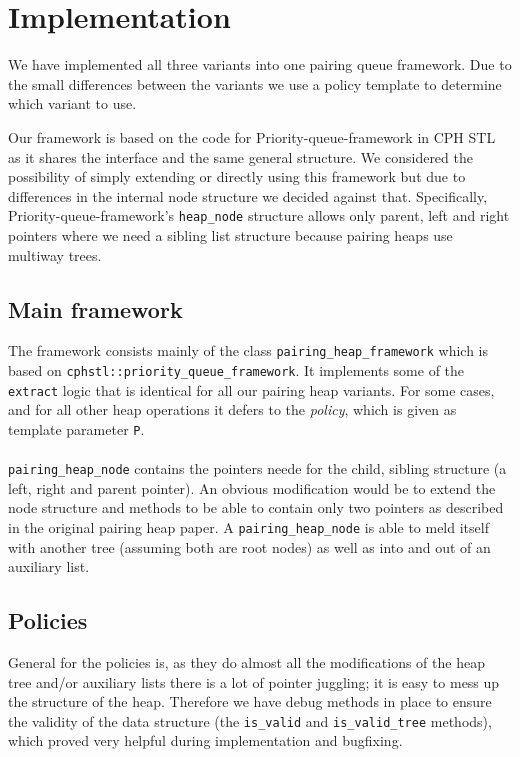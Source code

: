 \documentclass{DIKU-article}[2010/01/13]
\begin{document}
\section{Implementation}

We have implemented all three variants into one pairing queue framework. Due to
the small differences between the variants we use a policy template to determine
which variant to use. 

Our framework is based on the code for Priority-queue-framework in CPH STL as it
shares the interface and the same general structure. We considered the
possibility of simply extending or directly using this framework but due to
differences in the internal node structure we decided against that.
Specifically, Priority-queue-framework's \verb!heap_node! structure allows only
parent, left and right pointers where we need a sibling list structure because
pairing heaps use multiway trees.

\subsection{Main framework}

The framework consists mainly of the class \verb!pairing_heap_framework! which
is based on \verb!cphstl::priority_queue_framework!. It implements
some of the \verb!extract! logic that is identical for all our pairing heap
variants. For some cases, and for all other heap operations it defers to the
\emph{policy}, which is given as template parameter \verb!P!.\\
\\
\verb!pairing_heap_node! contains the pointers neede for the child, sibling
structure (a left, right and parent pointer). An obvious modification would be
to extend the node structure and methods to be able to contain only two pointers
as described in the original pairing heap paper\cite{fredman}. A
\verb!pairing_heap_node! is able to meld itself with another tree (assuming both
are root nodes) as well as into and out of an auxiliary list.

\subsection{Policies}

General for the policies is, as they do almost all the modifications of the heap
tree and/or auxiliary lists there is a lot of pointer juggling; it is easy to
mess up the structure of the heap. Therefore we have debug methods in place to
ensure the validity of the data structure (the \verb!is_valid! and
\verb!is_valid_tree! methods), which proved very helpful during implementation
and bugfixing.
\end{document}

